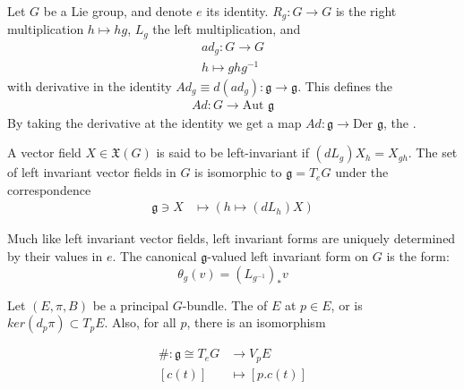 Let $G$ be a Lie group, and denote $e$ its identity. $R_g:G\rightarrow G$ is the right multiplication $h\mapsto hg$, $L_g$ the left multiplication, and \begin{align*}
ad_g:G\rightarrow G\\
h\mapsto ghg^{-1}                                                                                                                                                                                                                \end{align*}
with derivative in the identity $Ad_g\equiv d(ad_g):\mathfrak{g}\rightarrow \mathfrak{g}$. This defines the \begin{align*}                                                                                                                                          
Ad:G\rightarrow \text{Aut }\mathfrak{g}                                                                                                                                                         \end{align*}
By taking the derivative at the identity we get a map $Ad :\mathfrak{g}\rightarrow \text{Der }\mathfrak{g}$, the .


A vector field $X\in \mathfrak{X}(G)$ is said to be left-invariant if $(d L_g)X_h=X_{gh}$. The set of left invariant vector fields in $G$ is isomorphic to $\mathfrak{g}=T_e G$ under the correspondence\begin{align*}
\mathfrak{g}\ni X &\mapsto (h\mapsto (dL_h)X)
\end{align*}

Much like left invariant vector fields, left invariant forms are uniquely determined by their values in $e$. The canonical $\mathfrak{g}$-valued left invariant form on $G$ is the  form:
\begin{equation}\label{maurercartan}
\theta_g(v)=(L_{g^{-1}})_*v
\end{equation}


Let $(E,\pi,B)$ be a principal $G$-bundle. The  of $E$ at $p\in E$, or  is $ker(d_p \pi)\subset T_p E$.
Also, for all $p$, there is an isomorphism

\begin{align*}
 \#:\mathfrak{g}\cong T_e G&\rightarrow V_p E\\
[c(t)]&\mapsto [p.c(t)]\\
\end{align*}

